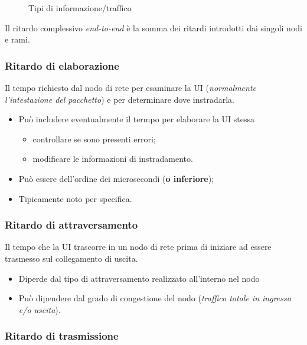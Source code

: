 \begin{figure}[ht]
  \centering
  \resizebox{5in}{!}{}
  \caption{Tipi di informazione/traffico}
  \label{fig:traffic}
\end{figure}
Il ritardo complessivo \textit{end-to-end} è la somma dei ritardi introdotti dai singoli nodi e rami.

\subsubsection{Ritardo di elaborazione}
\label{sec:ritelabo}
\begin{defi}
  Il tempo richiesto dal nodo di rete per esaminare la UI ({\it normalmente l'intestazione del pacchetto})
  e per determinare dove instradarla. 
\end{defi}
\begin{itemize}
\item Può includere eventualmente il termpo per elaborare la UI stessa
  \begin{itemize}
  \item controllare se sono presenti errori;
  \item modificare le informazioni di instradamento.
  \end{itemize}
\item Può essere dell'ordine dei microsecondi (\textbf{o inferiore});
\item Tipicamente noto per specifica. 
\end{itemize}

\subsubsection{Ritardo di attraversamento}
\label{sec:ritattra}

\begin{defi}
  Il tempo che la UI trascorre in un nodo di rete prima di iniziare ad essere trasmesso sul collegamento di
  uscita.
\end{defi}
\begin{itemize}
\item Diperde dal tipo di attraversamento realizzato all'interno nel nodo
\item Può dipendere dal grado di congestione del nodo (\textit{traffico totale in ingresso e/o uscita}).
\end{itemize}

\subsubsection{Ritardo di trasmissione}
\label{sec:rittrasm}

